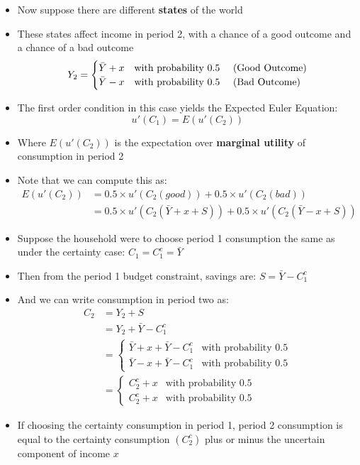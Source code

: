 \documentclass[a4paper,twoside]{article}
\newif\IfInSansMode
\numberwithin{equation}{section}
\numberwithin{figure}{section}
\begin{document}
	\begin{itemize}
		\item Now suppose there are different \textbf{states} of the world
		\item These states affect income in period 2, with a chance of a good outcome and a chance of a bad outcome
		\[	
			Y_2= 
			\begin{cases}
				\bar{Y} + x & \text{with probability 0.5 \quad (Good Outcome)} \\
				\bar{Y} - x & \text{with probability 0.5 \quad (Bad Outcome)}
			\end{cases}
		\]
		\item The first order condition in this case yields the \textcolor{myblue}{Expected Euler Equation:}
		\[
			u'(C_1) = E(u'(C_2))
		\]
		\item Where \( E(u'(C_2)) \) is the expectation over \textbf{marginal utility} of consumption in period 2
		\item Note that we can compute this as:
		\begin{align*}
			E(u'(C_2)) &= 0.5 \times u'(C_2(good)) + 0.5 \times u'(C_2(bad)) \\
			&= 0.5 \times u'(C_2(\bar{Y} + x + S)) + 0.5 \times u'(C_2(\bar{Y} - x + S))
		\end{align*}
		\item Suppose the household were to choose period 1 consumption the same as under the certainty case: \( C_1 = C_1^c = \bar{Y} \)
		\item Then from the period 1 budget constraint, savings are: \( S = \bar{Y} - C_1^c \)
		\item And we can write consumption in period two as:
		\begin{align*}
			C_2 &= Y_2 + S \\
			&= Y_2 + \bar{Y} - C_1^c \\
			&=
			\begin{cases}
				\bar{Y} + x + \bar{Y} - C_1^c & \text{with probability 0.5} \\
				\bar{Y} - x + \bar{Y} - C_1^c & \text{with probability 0.5}
			\end{cases}
			\\
			&=
			\begin{cases}
				C_2^c + x & \text{with probability 0.5} \\
				C_2^c + x & \text{with probability 0.5}
			\end{cases}
		\end{align*}
		\item If choosing the certainty consumption in period 1, period 2 consumption is equal to the certainty consumption \( (C_2^c) \) plus or minus the uncertain component of income \( x \)

\end{itemize}
\end{document}
